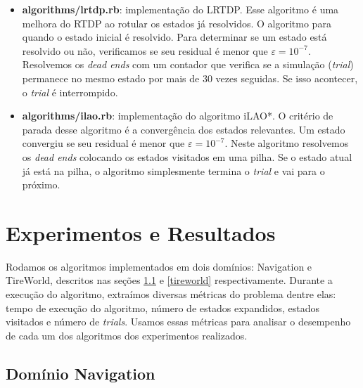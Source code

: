 \documentclass[12pt,a4paper]{article}
\begin{document}
\begin{itemize}
    \item \textbf{algorithms/lrtdp.rb}: implementação do LRTDP. Esse algoritmo é uma melhora do RTDP ao rotular os estados já resolvidos. O algoritmo para quando o estado inicial é resolvido. Para determinar se um estado está resolvido ou não, verificamos se seu residual é menor que $\varepsilon=10^{-7}$. Resolvemos os \textit{dead ends} com um contador que verifica se a simulação (\textit{trial}) permanece no mesmo estado por mais de 30 vezes seguidas. Se isso acontecer, o \textit{trial} é interrompido.
    \item \textbf{algorithms/ilao.rb}: implementação do algoritmo iLAO*. O critério de parada desse algoritmo é a convergência dos estados relevantes. Um estado convergiu se seu residual é menor que $\varepsilon=10^{-7}$. Neste algoritmo resolvemos os \textit{dead ends} colocando os estados visitados em uma pilha. Se o estado atual já está na pilha, o algoritmo simplesmente termina o \textit{trial} e vai para o próximo.
\end{itemize}






\section{Experimentos e Resultados}\label{experimentos}

Rodamos os algoritmos implementados em dois domínios: Navigation e TireWorld, descritos nas seções \ref{navigation} e \ref{tireworld} respectivamente. Durante a execução do algoritmo, extraímos diversas métricas do problema dentre elas: tempo de execução do algoritmo, número de estados expandidos, estados visitados e número de \textit{trials}. Usamos essas métricas para analisar o desempenho de cada um dos algoritmos dos experimentos realizados.


\subsection{Domínio Navigation}\label{navigation}
\end{document}
